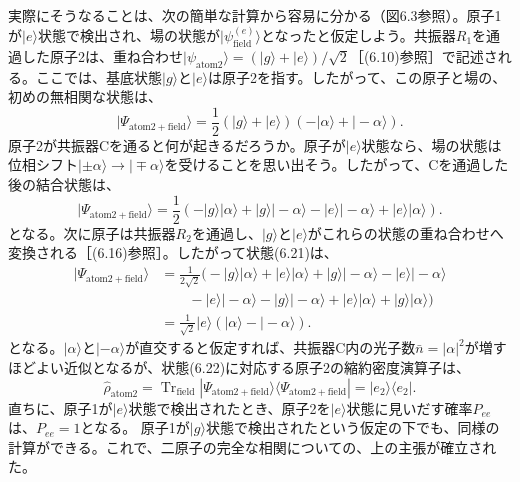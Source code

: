 実際にそうなることは、次の簡単な計算から容易に分かる（図6.3参照）。原子1が$|e\rangle$状態で検出され、場の状態が$|\psi_{\mathrm{field}}^{(e)}\rangle$となったと仮定しよう。共振器$R_1$を通過した原子2は、重ね合わせ$|\psi_{\mathrm{atom2}}\rangle=(|g\rangle+|e\rangle)/\sqrt2$［(6.10)参照］で記述される。ここでは、基底状態$|g\rangle$と$|e\rangle$は原子2を指す。したがって、この原子と場の、初めの無相関な状態は、
\begin{equation}|\Psi_{\mathrm{atom2+field}}\rangle=\frac12(|g\rangle+|e\rangle)(-|\alpha\rangle+|-\alpha\rangle).\tag{6.20}\end{equation}
原子2が共振器Cを通ると何が起きるだろうか。原子が$|e\rangle$状態なら、場の状態は位相シフト$|\pm\alpha\rangle\to|\mp\alpha\rangle$を受けることを思い出そう。したがって、Cを通過した後の結合状態は、
\hypertarget{srcpage:252}{}\label{srcpage:252}
\begin{equation}|\Psi_{\mathrm{atom2+field}}\rangle=\frac12(-|g\rangle|\alpha\rangle+|g\rangle|-\alpha\rangle-|e\rangle|-\alpha\rangle+|e\rangle|\alpha\rangle).\tag{6.21}\end{equation}
となる。次に原子は共振器$R_2$を通過し、$|g\rangle$と$|e\rangle$がこれらの状態の重ね合わせへ変換される［(6.16)参照］。したがって状態(6.21)は、
\begin{equation}\begin{aligned}
|\Psi_{\mathrm{atom2+field}}\rangle
&=\frac1{2\sqrt2}\bigl(-|g\rangle|\alpha\rangle+|e\rangle|\alpha\rangle+|g\rangle|-\alpha\rangle-|e\rangle|-\alpha\rangle\\
&\qquad-|e\rangle|-\alpha\rangle-|g\rangle|-\alpha\rangle+|e\rangle|\alpha\rangle+|g\rangle|\alpha\rangle\bigr)\\
&=\frac1{\sqrt2}|e\rangle(|\alpha\rangle-|-\alpha\rangle).
\end{aligned}\tag{6.22}\end{equation}
となる。$|\alpha\rangle$と$|-\alpha\rangle$が直交すると仮定すれば、共振器C内の光子数$\bar n=|\alpha|^2$が増すほどよい近似となるが、状態(6.22)に対応する原子2の縮約密度演算子は、
\begin{equation}
\hat\rho_{\mathrm{atom2}}=\operatorname{Tr}_{\mathrm{field}}|\Psi_{\mathrm{atom2+field}}\rangle\langle\Psi_{\mathrm{atom2+field}}|=|e_2\rangle\langle e_2|.\tag{6.23}
\end{equation}
直ちに、原子1が$|e\rangle$状態で検出されたとき、原子2を$|e\rangle$状態に見いだす確率$P_{ee}$は、$P_{ee}=1$となる。
\hypertarget{srcpage:253}{}\label{srcpage:253}
原子1が$|g\rangle$状態で検出されたという仮定の下でも、同様の計算ができる。これで、二原子の完全な相関についての、上の主張が確立された。

